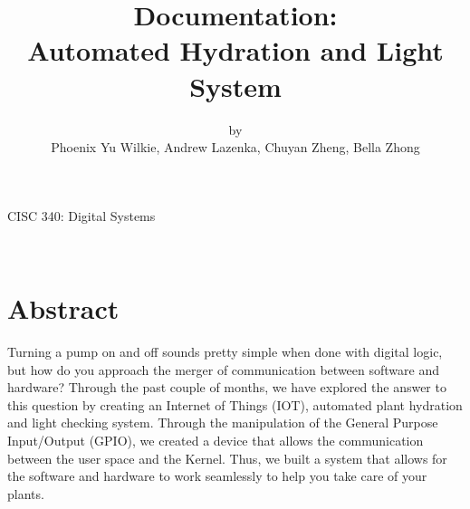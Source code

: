 \documentclass[a4paper]{article}
\begin{document}
 \maketitle
\begin{center}
\vskip 0.8cm

\baselineskip 1cm
\title{{\LARGE \bf  Documentation: \\ 
Automated Hydration and Light System
}}

{\large CISC 340: Digital Systems}\\

\vskip 1cm
\author{{\large by \\
Phoenix Yu Wilkie, Andrew Lazenka, Chuyan Zheng, Bella Zhong}}\\
\end{center}




\newpage

\newpage
\tableofcontents
\newpage


\section{Abstract}
Turning a pump on and off sounds pretty simple when done with digital logic, but how do you approach the merger of communication between software and hardware? Through the past couple of months, we have explored the answer to this question by creating an Internet of Things (IOT), automated plant hydration and light checking system. Through the manipulation of the General Purpose Input/Output (GPIO), we created a device that allows the communication between the user space and the Kernel. Thus, we built a system that allows for the software and hardware to work seamlessly to help you take care of your plants.
\end{document}
